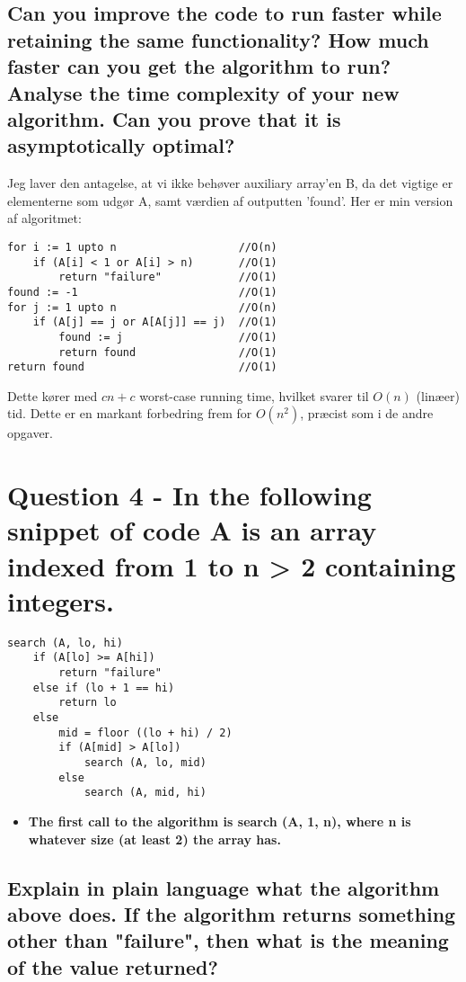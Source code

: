 \documentclass[a4paper,12pt]{article}
\begin{document}
\subsection[]{Can you improve the code to run faster while retaining the same functionality? How
much faster can you get the algorithm to run? Analyse the time complexity of your new
algorithm. Can you prove that it is asymptotically optimal?}

Jeg laver den antagelse, at vi ikke behøver auxiliary array'en B, da det vigtige er elementerne som udgør A, samt værdien af outputten 'found'.
Her er min version af algoritmet:
\begin{lstlisting}
for i := 1 upto n                   //O(n)
    if (A[i] < 1 or A[i] > n)       //O(1)
        return "failure"            //O(1)
found := -1                         //O(1)
for j := 1 upto n                   //O(n)
    if (A[j] == j or A[A[j]] == j)  //O(1)
        found := j                  //O(1)
        return found                //O(1)
return found                        //O(1)
\end{lstlisting}
Dette kører med $cn + c$ worst-case running time, hvilket svarer til $O(n)$ (linæer) tid. Dette er en markant forbedring frem for $O(n^2)$, præcist som i de andre opgaver.

\section[Question 4]{Question 4 - In the following snippet of code A is an array indexed from 1 to n > 2 containing integers.}

\begin{lstlisting}
search (A, lo, hi)
    if (A[lo] >= A[hi])
        return "failure"
    else if (lo + 1 == hi)
        return lo
    else 
        mid = floor ((lo + hi) / 2)
        if (A[mid] > A[lo])
            search (A, lo, mid)
        else
            search (A, mid, hi)
\end{lstlisting}
\begin{itemize}
    \item[] \textbf{The first call to the algorithm is search (A, 1, n), where n is whatever size (at least 2) the
    array has.}
\end{itemize}

\subsection[]{Explain in plain language what the algorithm above does. If the algorithm returns something other than "failure", then what is the meaning of the value returned?}
    
\end{document}
